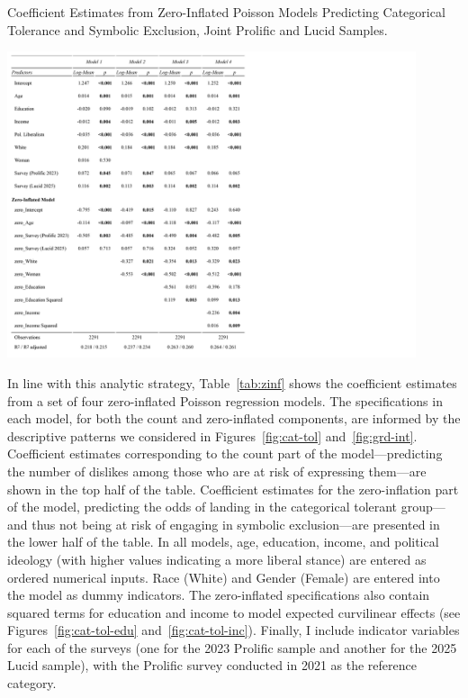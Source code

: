 \documentclass[12pt]{article}
\begin{document}
\begin{table}
    \caption{Coefficient Estimates from Zero-Inflated Poisson Models Predicting Categorical Tolerance and Symbolic Exclusion, Joint Prolific and Lucid Samples.}
    \centering
    \includegraphics[trim={0 0cm 45cm 0},clip, width=0.9\textwidth]{Tabs/zinf-reg.png}
    \label{tab:zinf}
\end{table}

In line with this analytic strategy, Table~\ref{tab:zinf} shows the coefficient estimates from a set of four zero-inflated Poisson regression models. The specifications in each model, for both the count and zero-inflated components, are informed by the descriptive patterns we considered in Figures~\ref{fig:cat-tol} and~\ref{fig:grd-int}. Coefficient estimates corresponding to the count part of the model---predicting the number of dislikes among those who are at risk of expressing them---are shown in the top half of the table. Coefficient estimates for the zero-inflation part of the model, predicting the odds of landing in the categorical tolerant group---and thus not being at risk of engaging in symbolic exclusion---are presented in the lower half of the table. In all models, age, education, income, and political ideology (with higher values indicating a more liberal stance) are entered as ordered numerical inputs. Race (White) and Gender (Female) are entered into the model as dummy indicators. The zero-inflated specifications also contain squared terms for education and income to model expected curvilinear effects (see Figures~\ref{fig:cat-tol-edu} and~\ref{fig:cat-tol-inc}). Finally, I include indicator variables for each of the surveys (one for the 2023 Prolific sample and another for the 2025 Lucid sample), with the Prolific survey conducted in 2021 as the reference category. 
\end{document}
